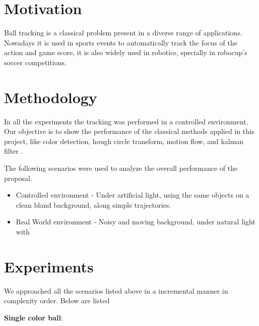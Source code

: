 \documentclass{sciposter}
\begin{document}
\begin{multicols}{3}


\section{Motivation}

Ball tracking is a classical problem present in a diverse range of applications. Nowadays it is used in sports events to automatically track the focus of the action and game score, it is also widely used in robotics, specially in robocup's soccer competitions.

\section{Methodology}

In all the experiments the tracking was performed in a controlled environment. Our objective is to show the performance of the classical methods applied in this project, like color detection, hough circle transform, motion flow, and kalman filter .

\bigbreak

The following scenarios were used to analyze the overall performance of the proposal.

\begin{itemize}

\item Controlled environment - Under artificial light, using the same objects on a clean bland background, along simple trajectories.
\item Real World environment - Noisy and moving background, under natural light with 

\end{itemize}

\section{Experiments}

We approached all the scenarios listed above in a incremental manner in complexity order. Below are listed

\bigbreak
\textbf{Single color ball}:


\end{multicols}
\end{document}
